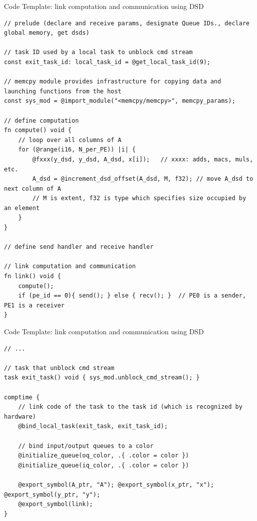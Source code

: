 \documentclass[dvipdfmx, 11pt, aspectratio=169]{beamer}   %
\begin{document}
\begin{frame}[fragile]{Code Template: link computation and communication using DSD}
\begin{lstlisting}[language=CSL, basicstyle=\ttfamily\tiny]
// prelude (declare and receive params, designate Queue IDs., declare global memory, get dsds)

// task ID used by a local task to unblock cmd stream
const exit_task_id: local_task_id = @get_local_task_id(9);

// memcpy module provides infrastructure for copying data and launching functions from the host
const sys_mod = @import_module("<memcpy/memcpy>", memcpy_params);

// define computation
fn compute() void {
    // loop over all columns of A
    for (@range(i16, N_per_PE)) |i| {
        @fxxx(y_dsd, y_dsd, A_dsd, x[i]);   // xxxx: adds, macs, muls, etc.
        A_dsd = @increment_dsd_offset(A_dsd, M, f32); // move A_dsd to next column of A
        // M is extent, f32 is type which specifies size occupied by an element
    }
}

// define send handler and receive handler

// link computation and communication
fn link() void {
    compute();
    if (pe_id == 0){ send(); } else { recv(); }  // PE0 is a sender, PE1 is a receiver
}
\end{lstlisting}
\end{frame}
\begin{frame}[fragile]{Code Template: link computation and communication using DSD}
\begin{lstlisting}[language=CSL, basicstyle=\ttfamily\tiny]
// ...

// task that unblock cmd stream
task exit_task() void { sys_mod.unblock_cmd_stream(); }

comptime {
    // link code of the task to the task id (which is recognized by hardware)
    @bind_local_task(exit_task, exit_task_id);

    // bind input/output queues to a color
    @initialize_queue(oq_color, .{ .color = color })
    @initialize_queue(iq_color, .{ .color = color })

    @export_symbol(A_ptr, "A"); @export_symbol(x_ptr, "x"); @export_symbol(y_ptr, "y");
    @export_symbol(link);
}
\end{lstlisting}
\end{frame}
\end{document}
